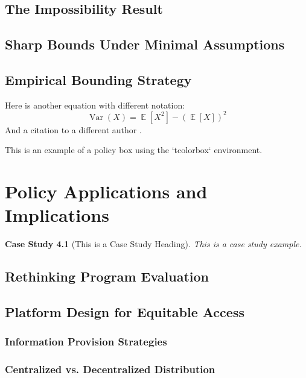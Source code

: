 \documentclass[11pt,letterpaper]{report}
\newtheorem{case}{Case Study}[chapter]
\theoremstyle{definition}
\theoremstyle{remark}
\DeclareMathOperator{\Var}{Var}
\DeclareMathOperator{\E}{\mathbb{E}}
\begin{document}
\section{The Impossibility Result}
\lipsum[2]

\section{Sharp Bounds Under Minimal Assumptions}
\lipsum[3-4]

\section{Empirical Bounding Strategy}
\lipsum[5]
Here is another equation with different notation:
\begin{equation}
    \Var(X) = \E[X^2] - (\E[X])^2
\end{equation}
And a citation to a different author \citep{Heckman2001}.

\begin{policybox}
This is an example of a policy box using the `tcolorbox` environment. \lipsum[6]
\end{policybox}

\chapter{Policy Applications and Implications}
\lipsum[1-2]

\begin{case}[This is a Case Study Heading]
This is a case study example. \lipsum[7-8]
\end{case}

\section{Rethinking Program Evaluation}
\lipsum[1]

\section{Platform Design for Equitable Access}
\lipsum[2]

\subsection{Information Provision Strategies}
\lipsum[3]

\subsection{Centralized vs. Decentralized Distribution}
\lipsum[4]
\end{document}
